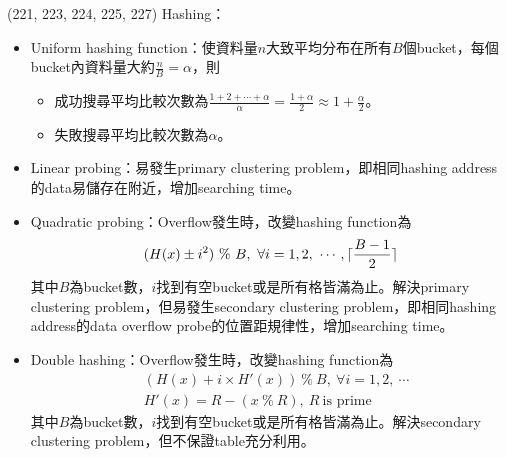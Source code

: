 \item \begin{theorem}{(221, 223, 224, 225, 227)} Hashing： \begin{itemize}
        \item Uniform hashing function：使資料量$n$大致平均分布在所有$B$個bucket，每個bucket內資料量大約$\frac{n}{B} = \alpha$，則\begin{itemize}
            \item 成功搜尋平均比較次數為$\frac{1 + 2 + \cdots + \alpha}{\alpha} = \frac{1 + \alpha}{2} \approx 1 + \frac{\alpha}{2}$。
            \item 失敗搜尋平均比較次數為$\alpha$。
        \end{itemize}
        \item Linear probing：易發生primary clustering problem，即相同hashing address的data易儲存在附近，增加searching time。
        \item Quadratic probing：Overflow發生時，改變hashing function為\begin{equation}
            (H(x) \pm i^2) \ \% \ B, \ \forall i = 1, 2, \ \cdots, \lceil\frac{B - 1}{2}\rceil
        \end{equation} 其中$B$為bucket數，$i$找到有空bucket或是所有格皆滿為止。解決primary clustering problem，但易發生secondary clustering problem，即相同hashing address的data overflow probe的位置距規律性，增加searching time。
        \item Double hashing：Overflow發生時，改變hashing function為\begin{equation}
            \begin{aligned}
                & (H(x) + i \times H'(x)) \ \% \ B, \ \forall i = 1, 2, \ \cdots \\
                & H'(x) = R - (x \ \% \ R), \ R \ \text{is prime}
            \end{aligned}
        \end{equation} 其中$B$為bucket數，$i$找到有空bucket或是所有格皆滿為止。解決secondary clustering problem，但不保證table充分利用。
    \end{itemize}
\end{theorem}